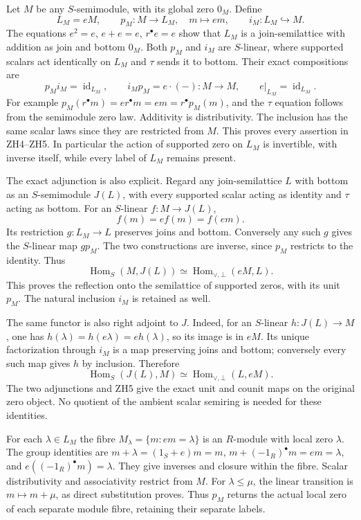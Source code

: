 \documentclass[
  10pt,
  a4paper,
]{article}
\begin{document}
Let \(M\) be any \(S\)-semimodule, with its global zero \(0_M\). Define
\[
L_M=eM,\qquad p_M:M\to L_M,\quad m\mapsto em,\qquad
i_M:L_M\hookrightarrow M.
\tag{ZH4}
\] The equations \(e^2=e\), \(e+e=e\), \(r^\bullet e=e\) show that
\(L_M\) is a join-semilattice with addition as join and bottom \(0_M\).
Both \(p_M\) and \(i_M\) are \(S\)-linear, where supported scalars act
identically on \(L_M\) and \(\tau\) sends it to bottom. Their exact
compositions are \[
p_Mi_M=\operatorname{id}_{L_M},\qquad
i_Mp_M=e\cdot(-):M\to M,\qquad
e|_{L_M}=\operatorname{id}_{L_M}.
\tag{ZH5}
\] For example \(p_M(r^\bullet m)=er^\bullet m=em=r^\bullet p_M(m)\),
and the \(\tau\) equation follows from the semimodule zero law.
Additivity is distributivity. The inclusion has the same scalar laws
since they are restricted from \(M\). This proves every assertion in
ZH4--ZH5. In particular the action of supported zero on \(L_M\) is
invertible, with inverse itself, while every label of \(L_M\) remains
present.

The exact adjunction is also explicit. Regard any join-semilattice \(L\)
with bottom as an \(S\)-semimodule \(J(L)\), with every supported scalar
acting as identity and \(\tau\) acting as bottom. For an \(S\)-linear
\(f:M\to J(L)\), \[
f(m)=e f(m)=f(em).
\tag{ZH6}
\] Its restriction \(g:L_M\to L\) preserves joins and bottom. Conversely
any such \(g\) gives the \(S\)-linear map \(gp_M\). The two
constructions are inverse, since \(p_M\) restricts to the identity. Thus
\[
\operatorname{Hom}_S(M,J(L))
\simeq\operatorname{Hom}_{\vee,\bot}(eM,L).
\tag{ZH7}
\] This proves the reflection onto the semilattice of supported zeros,
with its unit \(p_M\). The natural inclusion \(i_M\) is retained as
well.

The same functor is also right adjoint to \(J\). Indeed, for an
\(S\)-linear \(h:J(L)\to M\), one has
\(h(\lambda)=h(e\lambda)=eh(\lambda)\), so its image is in \(eM\). Its
unique factorization through \(i_M\) is a map preserving joins and
bottom; conversely every such map gives \(h\) by inclusion. Therefore \[
\operatorname{Hom}_S(J(L),M)
\simeq\operatorname{Hom}_{\vee,\bot}(L,eM).
\tag{ZH7a}
\] The two adjunctions and ZH5 give the exact unit and counit maps on
the original zero object. No quotient of the ambient scalar semiring is
needed for these identities.

For each \(\lambda\in L_M\) the fibre \(M_\lambda=\{m:em=\lambda\}\) is
an \(R\)-module with local zero \(\lambda\). The group identities are
\(m+\lambda=(1_S+e)m=m\), \(m+(-1_R)^\bullet m=em=\lambda\), and
\(e((-1_R)^\bullet m)=\lambda\). They give inverses and closure within
the fibre. Scalar distributivity and associativity restrict from \(M\).
For \(\lambda\le\mu\), the linear transition is \(m\mapsto m+\mu\), as
direct substitution proves. Thus \(p_M\) returns the actual local zero
of each separate module fibre, retaining their separate labels.
\end{document}
